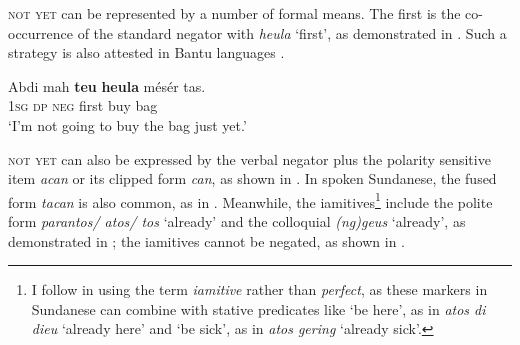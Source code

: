 \documentclass[output=paper]{langscibook}
\begin{document}
\textsc{not} \textsc{yet} can be represented by a number of formal means. The first is the co-occurrence of the standard negator with \textit{heula} ‘first’, as demonstrated in . Such a strategy is also attested in Bantu languages \citep{VeselinovaDevos2021}. 

\ea\label{ex:sun:6} 
    \gll  Abdi mah \textbf{teu} \textbf{heula} mésér tas.\\ 
          1\textsc{sg} \textsc{dp} \textsc{neg} first buy bag\\
    \glt ‘I’m not going to buy the bag just yet.’ \citep[88]{Butters2021}
\z 

\textsc{not} \textsc{yet} can also be expressed by the verbal negator plus the polarity sensitive item \textit{acan} or its clipped form \textit{can}, as shown in . In spoken Sundanese, the fused form \textit{tacan} is also common, as in . Meanwhile, the iamitives\footnote{I follow \citet{DahlWälchli2016} in using the term \textit{iamitive} rather than \textit{perfect}, as these markers in Sundanese can combine with stative predicates like ‘be here’, as in \textit{atos di dieu} ‘already here’ and ‘be sick’, as in \textit{atos gering} ‘already sick’.}  include the polite form \textit{parantos/ atos/ tos} ‘already’ and the colloquial \textit{(ng)geus} ‘already’, as demonstrated in ; the iamitives cannot be negated, as shown in . 



\ea\label{ex:sun:7}
    \z
\z 
    
\end{document}
